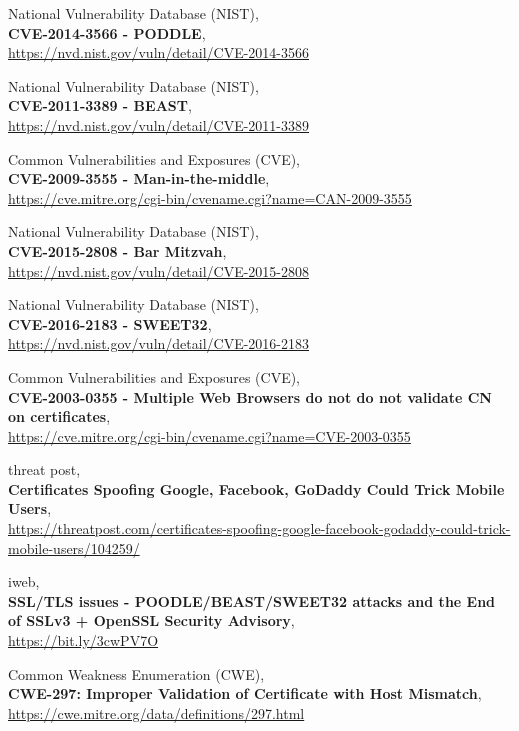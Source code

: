 \documentclass[10pt,a4paper]{article}
\begin{document}
\begin{thebibliography}{9}
	National Vulnerability Database (NIST),\\
	\textbf{CVE-2014-3566 - PODDLE},\\
	\url{https://nvd.nist.gov/vuln/detail/CVE-2014-3566}
	
	National Vulnerability Database (NIST),\\
	\textbf{CVE-2011-3389 - BEAST},\\
	\url{https://nvd.nist.gov/vuln/detail/CVE-2011-3389}
	
	Common Vulnerabilities and Exposures (CVE),\\
	\textbf{CVE-2009-3555 - Man-in-the-middle},\\
	\url{https://cve.mitre.org/cgi-bin/cvename.cgi?name=CAN-2009-3555}

	National Vulnerability Database (NIST),\\
	\textbf{CVE-2015-2808 - Bar Mitzvah},\\
	\url{https://nvd.nist.gov/vuln/detail/CVE-2015-2808}

	National Vulnerability Database (NIST),\\
	\textbf{CVE-2016-2183 - SWEET32},\\
	\url{https://nvd.nist.gov/vuln/detail/CVE-2016-2183}

	Common Vulnerabilities and Exposures (CVE),\\
	\textbf{CVE-2003-0355 - Multiple Web Browsers do not do not validate CN on certificates},\\
	\url{https://cve.mitre.org/cgi-bin/cvename.cgi?name=CVE-2003-0355}

	threat post,\\
	\textbf{Certificates Spoofing Google, Facebook, GoDaddy Could Trick Mobile Users},\\
	\footnotesize
	\url{https://threatpost.com/certificates-spoofing-google-facebook-godaddy-could-trick-mobile-users/104259/}
	\normalsize
	
	iweb,\\
	\textbf{SSL/TLS issues - POODLE/BEAST/SWEET32 attacks and the End of SSLv3 + OpenSSL Security Advisory},\\
	\footnotesize
	\url{https://bit.ly/3cwPV7O}
	\normalsize

	Common Weakness Enumeration (CWE),\\
	\textbf{CWE-297: Improper Validation of Certificate with Host Mismatch},\\
	\url{https://cwe.mitre.org/data/definitions/297.html}


\end{thebibliography}
\end{document}
